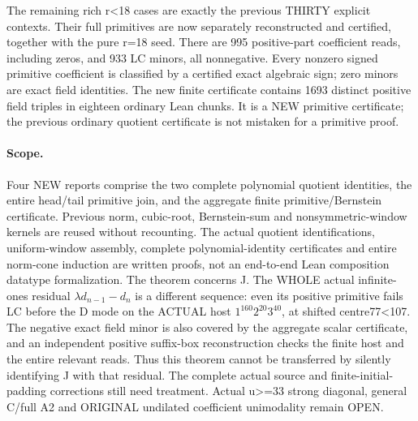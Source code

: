 The remaining rich r<18 cases are exactly the previous THIRTY
explicit contexts. Their full primitives are now separately
reconstructed and certified, together with the pure r=18 seed.
There are 995 positive-part coefficient reads, including zeros,
and 933 LC minors, all nonnegative. Every nonzero signed primitive
coefficient is classified by a certified exact algebraic sign;
zero minors are exact field identities. The new finite certificate
contains 1693 distinct positive field triples in eighteen ordinary
Lean chunks. It is a NEW primitive certificate; the previous ordinary
quotient certificate is not mistaken for a primitive proof.

\paragraph{Scope.}
Four NEW reports comprise the two complete polynomial quotient
identities, the entire head/tail primitive join, and the aggregate
finite primitive/Bernstein certificate. Previous norm, cubic-root,
Bernstein-sum and nonsymmetric-window kernels are reused without
recounting. The actual quotient identifications, uniform-window
assembly, complete polynomial-identity certificates and entire
norm-cone induction are written proofs, not an end-to-end Lean
composition datatype formalization.
The theorem concerns J. The WHOLE actual infinite-ones residual
$\lambda d_{n-1}-d_n$ is a different sequence: even its positive
primitive fails LC before the D mode on the ACTUAL host
$1^{160}2^{20}3^{40}$, at shifted centre77<107.
The negative exact field minor is also covered by the aggregate
scalar certificate, and an independent positive suffix-box
reconstruction checks the finite host and the entire relevant reads.
Thus this theorem cannot be transferred
by silently identifying J with that residual. The complete actual
source and finite-initial-padding corrections still need treatment.
Actual u>=33 strong diagonal, general C/full A2 and ORIGINAL
undilated coefficient unimodality remain OPEN.
